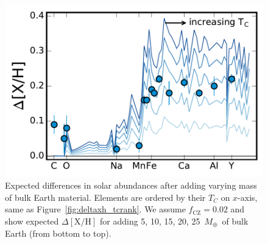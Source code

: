 \documentclass[12pt,letterpaper,margin=1in]{article}
\newcommand{\figname}{Figure}
\newcommand*\elem[1]{\ensuremath{\mathrm{#1}}}
\newcommand*\elemH[1]{\ensuremath{[\mathrm{#1}/\elem{H}]}}
\newcommand{\mearth}{\ensuremath{M_\oplus}}
\begin{document}
\begin{figure}[htpb]
  \centering
  \includegraphics[width=0.95\linewidth]{deltaxh_tcrank_vari.pdf}
  \caption{Expected differences in solar abundances after adding
    varying mass of bulk Earth material.
    Elements are ordered by their $T_C$ on $x$-axis, same as
    \figname~\ref{fig:deltaxh_tcrank}.
    We assume $f_\mathrm{CZ} = 0.02$ and show expected $\Delta\elemH{X}$
    for adding 5, 10, 15, 20, 25~\mearth\ of bulk Earth (from bottom to top).
  }
  \label{fig:vari}
\end{figure}
\end{document}
